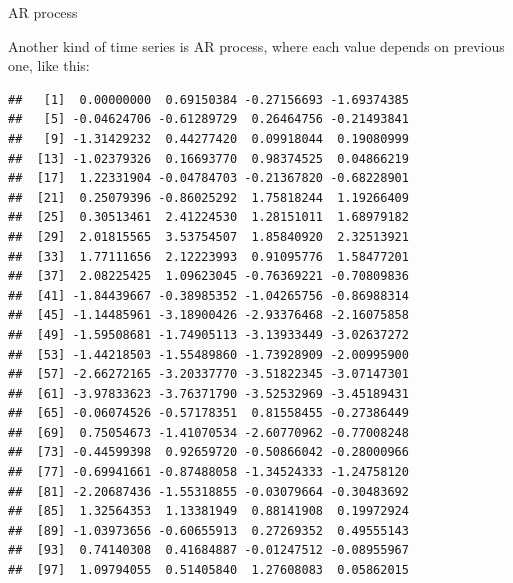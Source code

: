 \begin{frame}[fragile]{AR process}
  
Another kind of time series is AR process, where each value depends on previous one, like this:

{\footnotesize
\begin{knitrout}
\color{fgcolor}\begin{kframe}
\begin{alltt}
\hlkwb{=}\hlstd{(}\hlstd{)}
\hlkwb{=}\hlstd{(}\hlstd{)}
\hlstd{x[}\hlstd{]}\hlkwb{=}
\hlkwb{=}
   \hlopt{:}\hlstd{)}
\hlstd{\{}
  \hlkwb{=}\hlopt{*}\hlstd{x[i}\hlopt{-}\hlstd{]}\hlopt{+}
\hlstd{\}}
\end{alltt}
\begin{verbatim}
##   [1]  0.00000000  0.69150384 -0.27156693 -1.69374385
##   [5] -0.04624706 -0.61289729  0.26464756 -0.21493841
##   [9] -1.31429232  0.44277420  0.09918044  0.19080999
##  [13] -1.02379326  0.16693770  0.98374525  0.04866219
##  [17]  1.22331904 -0.04784703 -0.21367820 -0.68228901
##  [21]  0.25079396 -0.86025292  1.75818244  1.19266409
##  [25]  0.30513461  2.41224530  1.28151011  1.68979182
##  [29]  2.01815565  3.53754507  1.85840920  2.32513921
##  [33]  1.77111656  2.12223993  0.91095776  1.58477201
##  [37]  2.08225425  1.09623045 -0.76369221 -0.70809836
##  [41] -1.84439667 -0.38985352 -1.04265756 -0.86988314
##  [45] -1.14485961 -3.18900426 -2.93376468 -2.16075858
##  [49] -1.59508681 -1.74905113 -3.13933449 -3.02637272
##  [53] -1.44218503 -1.55489860 -1.73928909 -2.00995900
##  [57] -2.66272165 -3.20337770 -3.51822345 -3.07147301
##  [61] -3.97833623 -3.76371790 -3.52532969 -3.45189431
##  [65] -0.06074526 -0.57178351  0.81558455 -0.27386449
##  [69]  0.75054673 -1.41070534 -2.60770962 -0.77008248
##  [73] -0.44599398  0.92659720 -0.50866042 -0.28000966
##  [77] -0.69941661 -0.87488058 -1.34524333 -1.24758120
##  [81] -2.20687436 -1.55318855 -0.03079664 -0.30483692
##  [85]  1.32564353  1.13381949  0.88141908  0.19972924
##  [89] -1.03973656 -0.60655913  0.27269352  0.49555143
##  [93]  0.74140308  0.41684887 -0.01247512 -0.08955967
##  [97]  1.09794055  0.51405840  1.27608083  0.05862015
\end{verbatim}
\end{kframe}
\end{knitrout}
}
  
\end{frame}

